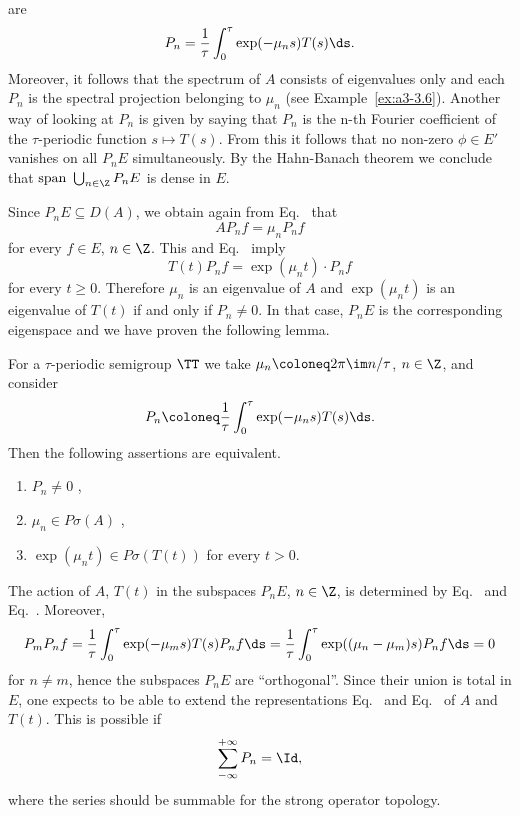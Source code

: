 are
\begin{equation}\label{eq:a3-5.2}
P_{n} = \frac{1}{\tau}\int_{0}^{\tau}\exp(-\mu_{n}s)T(s)  \ds .
\end{equation}
Moreover, it follows that the spectrum of\/ $A$ consists of eigenvalues only and each $P_{n}$ is the spectral projection belonging to $\mu_{n}$ (see Example~\ref{ex:a3-3.6}). 
Another way of looking at $P_{n}$ is given by saying that $P_{n}$ is the n-th Fourier coefficient of the $\tau$-periodic function $s \mapsto T(s)$.
From this it follows that no non-zero $\phi \in E'$ vanishes on all $P_{n}E$ simultaneously.
By the Hahn-Banach theorem we conclude that $\text{span } \bigcup_{n \in \Z} P_{n}E$ is dense in $E$.

Since $P_{n}E \subseteq D(A)$, we obtain again from Eq.~ that
\begin{equation}\label{eq:a3-5.3}
AP_{n}f = \mu_{n}P_{n}f
\end{equation}
for every $f \in E$, $n \in \Z$.
This and Eq.~ imply
\begin{equation}\label{eq:a3-5.4}
T(t)P_{n}f = \exp(\mu_{n}t) \cdot P_{n}f
\end{equation}
for every $t \geq 0$.
Therefore $\mu_{n}$ is an eigenvalue of\/ $A$ and $\exp(\mu_{n}t)$ is an eigenvalue of\/ $T(t)$ if and only if\/ $P_{n} \neq 0$.
In that case, $P_{n}E$ is the corresponding eigenspace and we have proven the following lemma.
\begin{lemma}\label{lem:a3-5.3}
For a $\tau$-periodic semigroup $\TT$ we take $\mu_{n} \coloneq 2\pi\im n/\tau$, $n \in \Z$, and consider
\[
P_{n} \coloneq \frac{1}{\tau}\int_{0}^{\tau} \exp(-\mu_{n}s)T(s)  \ds .
\]
Then the following assertions are equivalent.
\begin{enumerate}[\upshape (a)]
\item 
$P_{n} \neq 0$ ,

\item 
$\mu_{n} \in P\sigma(A)$ ,

\item 
$\exp(\mu_{n}t) \in P\sigma(T(t))$ for every $t > 0$. 

\end{enumerate}
\end{lemma}
The action of\/ $A$, \resp $T(t)$ in the subspaces $P_{n}E$, $n \in \Z$, is determined by Eq.~ and Eq.~.
Moreover,
\[
	P_{m}P_{n}f =  \frac{1}{\tau}\int_{0}^{\tau} \exp(-\mu_{m}s)T(s)P_{n}f  \ds 
	=  \frac{1}{\tau}\int_{0}^{\tau} \exp((\mu_{n}-\mu_{m})s)P_{n}f  \ds = 0
\]
for $n \neq m$, hence the subspaces $P_{n}E$ are \enquote{orthogonal}.
Since their union is total in $E$, one expects to be able to extend the representations Eq.~ and Eq.~ of\/ $A$ and $T(t)$.
This is possible if
\[
	\sum_{-\infty}^{+\infty} P_{n} = \Id ,
\]
where the series should be summable for the strong operator topology.

